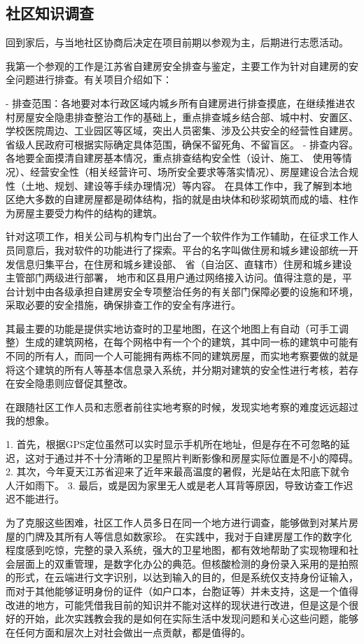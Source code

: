 \documentclass[AutoFakeBold]{LZUThesis}
\begin{document}
\subsection{社区知识调查}


回到家后，与当地社区协商后决定在项目前期以参观为主，后期进行志愿活动。

我第一个参观的工作是江苏省自建房安全排查与鉴定，主要工作为针对自建房的安全问题进行排查。有关项目介绍如下：

- 排查范围：各地要对本行政区域内城乡所有自建房进行排查摸底，在继续推进农村房屋安全隐患排查整治工作的基础上，重点排查城乡结合部、城中村、安置区、学校医院周边、工业园区等区域，突出人员密集、涉及公共安全的经营性自建房。省级人民政府可根据实际确定具体范围，确保不留死角、不留盲区。
- 排查内容。各地要全面摸清自建房基本情况，重点排查结构安全性（设计、施工、 使用等情况）、经营安全性（相关经营许可、场所安全要求等落实情况）、房屋建设合法合规性（土地、规划、建设等手续办理情况）等内容。
在具体工作中，我了解到本地区绝大多数的自建房屋都是砌体结构，指的就是由块体和砂浆砌筑而成的墙、柱作为房屋主要受力构件的结构的建筑。

针对这项工作，相关公司与机构专门出台了一个软件作为工作辅助，在征求工作人员同意后，我对软件的功能进行了探索。平台的名字叫做住房和城乡建设部统一开发信息归集平台，在住房和城乡建设部、 省（自治区、直辖市）住房和城乡建设主管部门两级进行部署， 地市和区县用户通过网络接入访问。值得注意的是，平台计划中由各级承担自建房安全专项整治任务的有关部门保障必要的设施和环境，采取必要的安全措施，确保排查工作的安全有序进行。

其最主要的功能是提供实地访查时的卫星地图，在这个地图上有自动（可手工调整）生成的建筑网格，在每个网格中有一个个的建筑，其中同一栋的建筑中可能有不同的所有人，而同一个人可能拥有两栋不同的建筑房屋，而实地考察要做的就是将这个建筑的所有人等基本信息录入系统，并分期对建筑的安全性进行考核，若存在安全隐患则应督促其整改。

在跟随社区工作人员和志愿者前往实地考察的时候，发现实地考察的难度远远超过我的想象。

1. 首先，根据GPS定位虽然可以实时显示手机所在地址，但是存在不可忽略的延迟，这对于通过并不十分清晰的卫星照片判断影像和房屋实际位置是不小的障碍。
2. 其次，今年夏天江苏省迎来了近年来最高温度的暑假，光是站在太阳底下就令人汗如雨下。
3. 最后，或是因为家里无人或是老人耳背等原因，导致访查工作迟迟不能进行。

为了克服这些困难，社区工作人员多日在同一个地方进行调查，能够做到对某片房屋的门牌及其所有人等信息如数家珍。
在实践中，我对于自建房屋工作的数字化程度感到吃惊，完整的录入系统，强大的卫星地图，都有效地帮助了实现物理和社会层面上的双重管理，是数字化办公的典范。但核酸检测的身份录入采用的是拍照的形式，在云端进行文字识别，以达到输入的目的，但是系统仅支持身份证输入，而对于其他能够证明身份的证件（如户口本，台胞证等）并未支持，这是一个值得改进的地方，可能凭借我目前的知识并不能对这样的现状进行改进，但是这是个很好的开始，此次实践教会我的是如何在实际生活中发现问题和关心这些问题，能够在任何方面和层次上对社会做出一点贡献，都是值得的。
\end{document}

